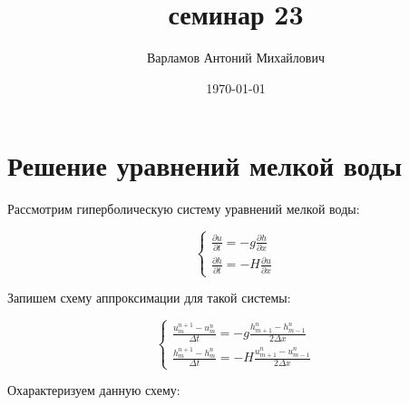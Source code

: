 \documentclass[10pt,a4paper]{article}
\title{семинар 23}
\date{\today}
\author{Варламов Антоний Михайлович}
\begin{document}
	\maketitle
	
	\section{Решение уравнений мелкой воды}
	
	Рассмотрим гиперболическую систему уравнений мелкой воды:
	
	\begin{equation}
		\begin{cases}
			\frac{\partial u}{\partial t} = -g\frac{\partial h}{\partial x}
			\\
			\frac{\partial h}{\partial t} = -H\frac{\partial u}{\partial x}
		\end{cases}
	\end{equation}
	
	Запишем схему аппроксимации для такой системы:
	
	\begin{equation}
		\begin{cases}
			\frac{u^{n + 1}_{m} - u^{n}_{m}}{\Delta t} =
			 -g\frac{h^{n}_{m + 1} - h^{n}_{m - 1}}{2\Delta x}
			\\
			\frac{h^{n + 1}_{m} - h^{n}_{m}}{\Delta t} =
			 -H\frac{u^{n}_{m + 1} - u^{n}_{m - 1}}{2\Delta x}
		\end{cases}
	\end{equation}
	
	Охарактеризуем данную схему:
	
\end{document}
